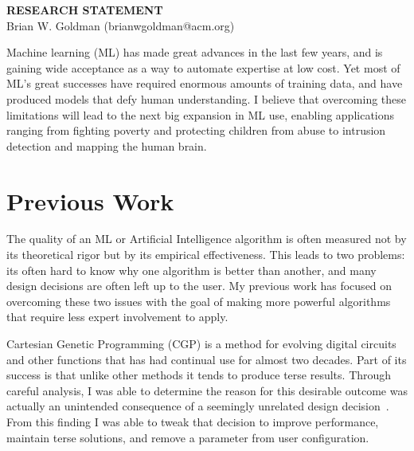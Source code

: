 \documentclass[a4paper, 11pt]{article}
\begin{document}
\thispagestyle{empty}

\pagestyle{fancy}

\begin{center}
{\LARGE \bf RESEARCH STATEMENT}\\
\vspace*{0.1cm}
{\normalsize Brian W. Goldman (brianwgoldman@acm.org)}
\end{center}

\noindent
Machine learning (ML) has made great advances in the last few years, and is gaining wide
acceptance as a way to automate expertise at low cost. Yet most of ML's great successes
have required enormous amounts of training data, and have produced models that
defy human understanding. I believe that overcoming these limitations will lead to the
next big expansion in ML use, enabling applications ranging from fighting poverty and
protecting children from abuse to intrusion detection and mapping the human brain.


\section{Previous Work}
The quality of an ML or Artificial Intelligence algorithm is often measured
not by its theoretical rigor but by its empirical effectiveness. This leads
to two problems: its often hard to know why one algorithm is better than
another, and many design decisions are often left up to the user. My previous
work has focused on overcoming these two issues with the goal of making
more powerful algorithms that require less expert involvement to apply.

Cartesian Genetic Programming (CGP) is a method for evolving digital circuits
and other functions that has had continual use for almost two decades. Part of its
success is that unlike other methods it tends to produce terse results. Through
careful analysis, I was able to determine the reason for this desirable outcome
was actually an unintended consequence of a seemingly unrelated design
decision~\cite{goldman:2013:ordering,goldman:2015:cgpanalysis}. From this finding
I was able to tweak that decision to improve performance, maintain
terse solutions, and remove a parameter from user configuration.
\end{document}
